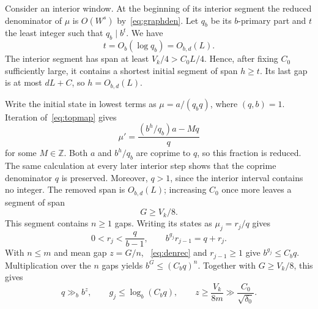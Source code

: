 \documentclass[a4paper,10pt]{amsart}
\theoremstyle{remark}
\newcommand{\Z}{\mathbb Z}
\begin{document}
Consider an interior window. At the beginning of its interior segment the
reduced denominator of $\mu$ is $O(W^s)$ by~\eqref{eq:graphden}. Let $q_b$
be its $b$-primary part and $t$ the least integer such that $q_b\mid b^t$.
We have
\[
 t=O_b(\log q_b)=O_{b,d}(L).
\]
The interior segment has span at least $V_k/4>C_0L/4$. Hence, after fixing
$C_0$ sufficiently large, it contains a shortest initial segment of span
$h\ge t$. Its last gap is at most $dL+C$, so $h=O_{b,d}(L)$.

Write the initial state in lowest terms as $\mu=a/(q_bq)$, where $(q,b)=1$.
Iteration of~\eqref{eq:topmap} gives
\[
 \mu'=\frac{(b^h/q_b)a-Mq}{q}
\]
for some $M\in\Z$. Both $a$ and $b^h/q_b$ are coprime to $q$, so this fraction
is reduced. The same calculation at every later interior step shows that the
coprime denominator $q$ is preserved. Moreover, $q>1$, since the interior
interval contains no integer. The removed span is $O_{b,d}(L)$; increasing
$C_0$ once more leaves a segment of span
\[
 G\ge V_k/8.
\]
This segment contains $n\ge1$ gaps.
Writing its states as $\mu_j=r_j/q$ gives
\begin{equation}\label{eq:denrec}
 0<r_j<\frac q{b-1},\qquad
 b^{g_j}r_{j-1}=q+r_j.
\end{equation}
With $n\le m$ and mean gap $z=G/n$,
~\eqref{eq:denrec} and $r_{j-1}\ge1$ give $b^{g_j}\le C_bq$.
Multiplication over the $n$ gaps yields $b^G\le(C_bq)^n$. Together with
$G\ge V_k/8$, this gives
\begin{equation}\label{eq:qz}
 q\gg_b b^z,\qquad g_j\le\log_b(C_bq),\qquad
 z\ge\frac{V_k}{8m}\gg\frac{C_0}{\sqrt{\delta_0}}.
\end{equation}
\end{document}
